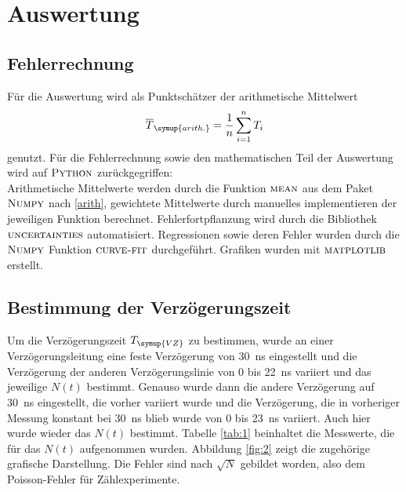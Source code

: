 \documentclass[
  bibliography=totoc,     %
  captions=tableheading,  %
  titlepage=firstiscover, %
]{scrartcl}
\begin{document}
\section{Auswertung}
\label{sec:auswertung}

\subsection{Fehlerrechnung}
  Für die Auswertung wird als Punktschätzer der arithmetische Mittelwert
  \begin{equation}
    \overline{T}_{\symup{arith.}} = \frac{1}{n} \sum_{i=1}^{n} T_{i}
    \label{arith}
  \end{equation}
  genutzt.
    Für die Fehlerrechnung sowie den mathematischen Teil der Auswertung wird auf
    $\textsc{Python}$ zurückgegriffen:\\
    Arithmetische Mittelwerte werden durch die Funktion $\textsc{mean}$ aus dem
    Paket $\textsc{Numpy}$ nach \eqref{arith},
    gewichtete Mittelwerte durch manuelles implementieren der jeweiligen
    Funktion berechnet. Fehlerfortpflanzung wird durch die Bibliothek
    $\textsc{uncertainties}$ automatisiert. Regressionen
    sowie deren Fehler wurden durch die $\textsc{Numpy}$ Funktion
    $\textsc{curve-fit}$ durchgeführt. Grafiken wurden mit $\textsc{matplotlib}$
    erstellt.
\subsection{Bestimmung der Verzögerungszeit}
Um die Verzögerungszeit $T_{\symup{VZ}}$ zu bestimmen, wurde an einer Verzögerungsleitung eine
feste Verzögerung von \SI{30}{\nano\second} eingestellt und die Verzögerung der anderen
Verzögerungslinie von 0 bis \SI{22}{\nano\second} variiert und das jeweilige $N(t)$ bestimmt.
Genauso wurde dann die andere Verzögerung auf \SI{30}{\nano\second} eingestellt,
die vorher variiert wurde und die Verzögerung, die in vorheriger Messung konstant
bei \SI{30}{\nano\second} blieb wurde von 0 bis \SI{23}{\nano\second} variiert.
Auch hier wurde wieder das $N(t)$ bestimmt.
Tabelle \ref{tab:1} beinhaltet die Messwerte, die für das $N(t)$ aufgenommen
wurden. Abbildung \ref{fig:2} zeigt die zugehörige grafische Darstellung. Die Fehler
sind nach $\sqrt{N}$ gebildet worden, also dem Poisson-Fehler für Zählexperimente.
\end{document}
